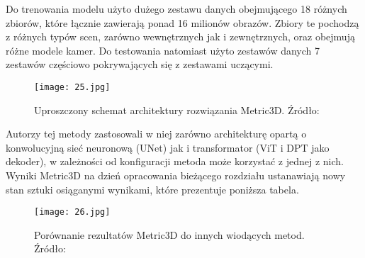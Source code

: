 Do trenowania modelu użyto dużego zestawu danych obejmującego 18 różnych zbiorów, które łącznie zawierają ponad 16 milionów obrazów. Zbiory te pochodzą z różnych typów scen, zarówno wewnętrznych jak i zewnętrznych, oraz obejmują różne modele kamer. Do testowania natomiast użyto zestawów danych 7 zestawów częściowo pokrywających się z zestawami uczącymi.

\begin{figure}[H]
    \centering
    \texttt{[image: 25.jpg]}
    \caption{Uproszczony schemat architektury rozwiązania Metric3D. Źródło: \cite{hu2024}}
    \label{fig:metric3d-schema}
\end{figure}

Autorzy tej metody zastosowali w niej zarówno architekturę opartą o konwolucyjną sieć neuronową (UNet) jak i transformator (ViT i DPT jako dekoder), w zależności od konfiguracji metoda może korzystać z jednej z nich. Wyniki Metric3D na dzień opracowania bieżącego rozdziału ustanawiają nowy stan sztuki osiąganymi wynikami, które prezentuje poniższa tabela.
\begin{figure}[H]
    \centering
    \texttt{[image: 26.jpg]}
    \caption{Porównanie rezultatów Metric3D do innych wiodących metod. Źródło: \cite{hu2024}}
    \label{fig:metric3d-results}
\end{figure}

